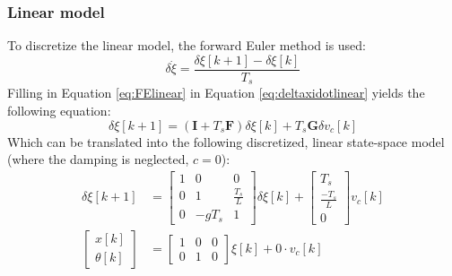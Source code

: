 \documentclass[a4paper,kul]{kulakarticle} %
\begin{document}
\subsubsection*{Linear model}
To discretize the linear model, the forward Euler method is used:
\begin{equation}
	\delta\dot{\xi} = \frac{\delta\xi[k+1]-\delta\xi[k]}{T_s}
	\label{eq:FElinear}
\end{equation}
Filling in Equation \ref{eq:FElinear} in Equation \ref{eq:deltaxidotlinear} yields the following equation:
\begin{equation}
	\delta\xi[k+1] = (\mathbf{I} + T_s\mathbf{F})\delta\xi[k] + T_s\mathbf{G}\delta v_c[k]
	\end{equation}
	Which can be translated into the following discretized, linear state-space model (where the damping is neglected, $c = 0$):
	\begin{equation}
	\begin{split}
	\delta\xi[k+1] &= \begin{bmatrix}
	1&0&0\\0&1&\frac{T_s}{L}\\0&-gT_s&1
	\end{bmatrix}\delta\xi[k] + \begin{bmatrix}
	T_s\\ \frac{-T_s}{L}\\0
	\end{bmatrix}v_c[k]\\
	\begin{bmatrix}
	x[k]\\\theta[k]
	\end{bmatrix} &= \begin{bmatrix}
	1&0&0\\0&1&0
	\end{bmatrix}\xi[k] + 0 \cdot v_c[k]
	\end{split}
	\label{eq:sslineardiscr}
\end{equation}
\end{document}

